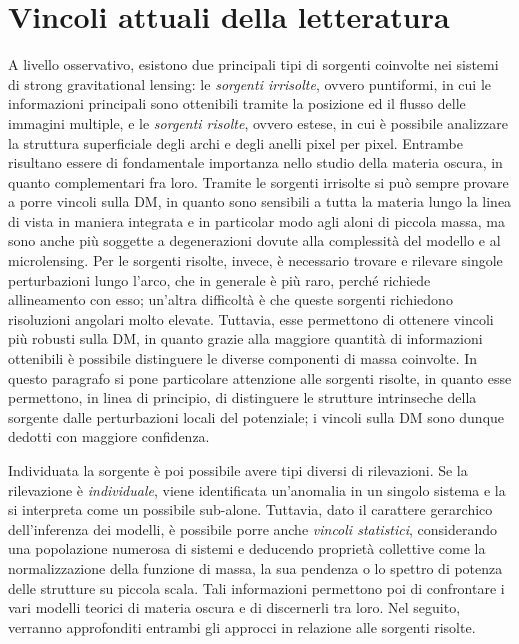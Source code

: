 \section{Vincoli attuali della letteratura}
A livello osservativo, esistono due  principali tipi di sorgenti coinvolte nei sistemi di strong gravitational lensing: le \emph{sorgenti irrisolte}, ovvero puntiformi, in cui le informazioni principali sono ottenibili tramite la posizione ed il flusso delle immagini multiple, e le \emph{sorgenti risolte}, ovvero estese, in cui è possibile analizzare la struttura superficiale degli archi e degli anelli pixel per pixel. 
Entrambe risultano essere di fondamentale importanza nello studio della materia oscura, in quanto complementari fra loro. Tramite le sorgenti irrisolte si può sempre provare a porre vincoli sulla DM, in quanto sono sensibili a tutta la materia lungo la linea di vista in maniera integrata e in particolar modo agli aloni di piccola massa, ma sono anche più soggette a degenerazioni dovute alla complessità del modello e al microlensing. Per le sorgenti risolte, invece, è necessario trovare e rilevare singole perturbazioni lungo l'arco, che in generale è più raro, perché richiede allineamento con esso; un'altra difficoltà è che queste sorgenti richiedono risoluzioni  angolari molto elevate. Tuttavia, esse permettono di ottenere vincoli più robusti sulla DM, in quanto grazie alla maggiore quantità di informazioni ottenibili è possibile distinguere le diverse componenti di massa coinvolte. 
In questo paragrafo si pone particolare attenzione alle sorgenti risolte, in quanto esse permettono, in linea di principio, di distinguere le strutture intrinseche della sorgente dalle perturbazioni locali del potenziale; i vincoli sulla DM sono dunque dedotti con maggiore confidenza.

Individuata la sorgente è poi possibile avere tipi diversi di rilevazioni.
Se la rilevazione è \emph{individuale}, viene identificata un'anomalia in un singolo sistema e la si interpreta come un possibile sub-alone. Tuttavia, dato il carattere gerarchico dell'inferenza dei modelli, è possibile porre anche \emph{vincoli statistici}, considerando una popolazione numerosa di sistemi e deducendo proprietà collettive come  la normalizzazione della funzione di massa, la sua pendenza o lo spettro di potenza delle strutture su piccola scala. Tali informazioni permettono poi di confrontare i vari modelli teorici di materia oscura e di discernerli tra loro. Nel seguito, verranno approfonditi entrambi gli approcci in relazione alle sorgenti risolte.

